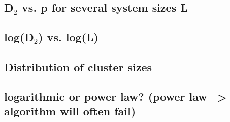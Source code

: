 \documentclass{umthesis}
\begin{document}
\subsection{D$_2$ vs. p for several system sizes L}
\label{sec-4.5.1}
\subsection{log(D$_2$) vs. log(L)}
\label{sec-4.5.2}
\subsection{Distribution of cluster sizes}
\label{sec-4.5.3}
\subsection{logarithmic or power law? (power law --> algorithm will often fail)}
\label{sec-4.5.4}






 
\end{document}

